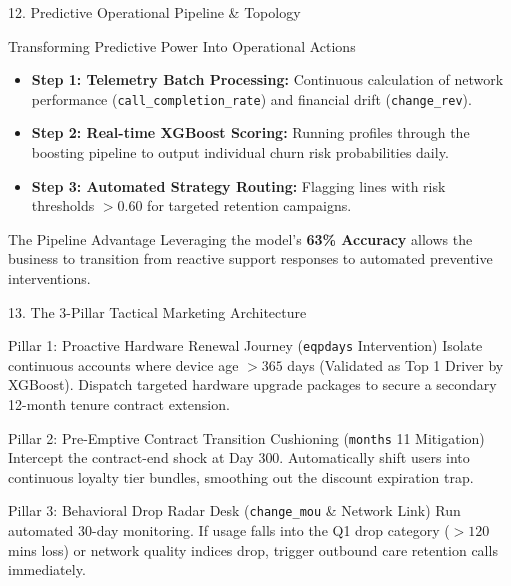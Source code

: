 \documentclass[10pt,aspectratio=169]{beamer}
\begin{document}
\begin{frame}{12. Predictive Operational Pipeline \& Topology}
  \begin{block}{Transforming Predictive Power Into Operational Actions}
    \begin{itemize}
      \item \textbf{Step 1: Telemetry Batch Processing:} Continuous calculation of network performance (\texttt{call\_completion\_rate}) and financial drift (\texttt{change\_rev}).
      \item \textbf{Step 2: Real-time XGBoost Scoring:} Running profiles through the boosting pipeline to output individual churn risk probabilities daily.
      \item \textbf{Step 3: Automated Strategy Routing:} Flagging lines with risk thresholds $> 0.60$ for targeted retention campaigns.
    \end{itemize}
  \end{block}
  \begin{exampleblock}{The Pipeline Advantage}
    Leveraging the model's \textbf{63\% Accuracy} allows the business to transition from reactive support responses to automated preventive interventions.
  \end{exampleblock}
\end{frame}

\begin{frame}{13. The 3-Pillar Tactical Marketing Architecture}
  \begin{block}{Pillar 1: Proactive Hardware Renewal Journey (\texttt{eqpdays} Intervention)}
    Isolate continuous accounts where device age $> 365$ days (Validated as Top 1 Driver by XGBoost). Dispatch targeted hardware upgrade packages to secure a secondary 12-month tenure contract extension.
  \end{block}
  
  \begin{block}{Pillar 2: Pre-Emptive Contract Transition Cushioning (\texttt{months} 11 Mitigation)}
    Intercept the contract-end shock at Day 300. Automatically shift users into continuous loyalty tier bundles, smoothing out the discount expiration trap.
  \end{block}

  \begin{block}{Pillar 3: Behavioral Drop Radar Desk (\texttt{change\_mou} \& Network Link)}
    Run automated 30-day monitoring. If usage falls into the Q1 drop category ($>120$ mins loss) or network quality indices drop, trigger outbound care retention calls immediately.
  \end{block}
\end{frame}
\end{document}
